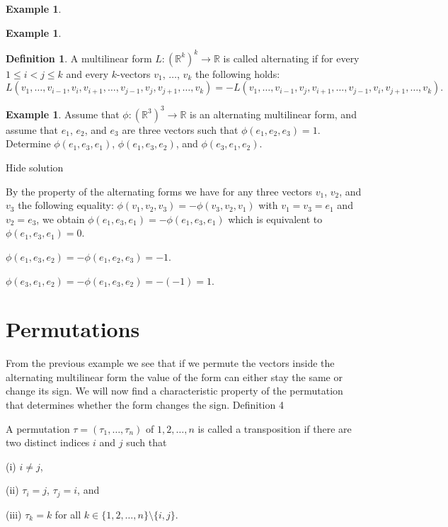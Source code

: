\documentclass[11pt]{article}
\theoremstyle{definition}
\newtheorem{defn}[thm]{Definition}
\newtheorem{exmp}[thm]{Example}
\theoremstyle{plain}
\begin{document}
\begin{exmp}
\begin{exmp}
\begin{defn}
A multilinear form \( L: \left(\mathbb R^k\right)^k\to\mathbb R \) is called alternating if for every \( 1\leq i< j\leq k \) and every \( k \)-vectors \( v_1 \), \( \dots \), \( v_k \) the following holds: \[ L(v_1, \dots,v_{i-1}, v_i, v_{i+1},\dots, v_{j-1},v_j,v_{j+1},\dots, v_k)=-L(v_1,\dots,v_{i-1}, v_j, v_{i+1},\dots, v_{j-1},v_i,v_{j+1},\dots, v_k).\]
\end{defn}

\begin{exmp}
Assume that \( \phi:\left(\mathbb R^3\right)^3\to \mathbb R \) is an alternating multilinear form, and assume that \( e_1 \), \( e_2 \), and \( e_3 \) are three vectors such that \( \phi(e_1,e_2,e_3)=1 \). Determine \( \phi(e_1,e_3,e_1) \), \( \phi(e_1,e_3,e_2) \), and \( \phi(e_3,e_1,e_2) \).
\end{exmp}

Hide solution

By the property of the alternating forms we have for any three vectors \( v_1 \), \( v_2 \), and \( v_3 \) the following equality: \( \phi(v_1,v_2,v_3)=-\phi(v_3,v_2,v_1) \) with \( v_1=v_3=e_1 \) and \( v_2=e_3 \), we obtain \( \phi(e_1,e_3,e_1)=-\phi(e_1,e_3,e_1) \) which is equivalent to \( \phi(e_1,e_3,e_1)=0 \).

\( \phi(e_1,e_3,e_2)=-\phi(e_1,e_2,e_3)=-1 \).

\( \phi(e_3,e_1,e_2)=-\phi(e_1,e_3,e_2)=-(-1)=1 \).

\section{Permutations}

From the previous example we see that if we permute the vectors inside the alternating multilinear form the value of the form can either stay the same or change its sign. We will now find a characteristic property of the permutation that determines whether the form changes the sign.
Definition 4


A permutation \( \tau=(\tau_1, \dots, \tau_n) \) of \( 1,2,\dots, n \) is called a transposition if there are two distinct indices \( i \) and \( j \) such that

    (i) \( i\neq j \),

    (ii) \( \tau_i=j \), \( \tau_j=i \), and

    (iii) \( \tau_k=k \) for all \( k\in\{1,2,\dots, n\}\setminus\{i,j\} \).


\end{exmp}
\end{exmp}
\end{document}
